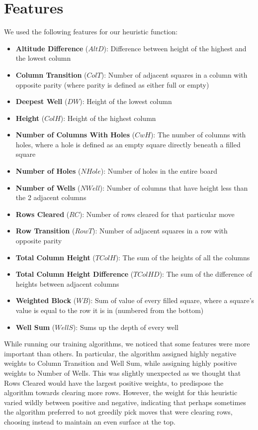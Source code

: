 \documentclass[12pt]{article}
\begin{document}
    \section{Features}
    We used the following features for our heuristic function:
    \begin{itemize}
		\setlength\itemsep{-1mm}
        \item \textbf{Altitude Difference} ($AltD$): Difference between height of the highest
        and the lowest column
		\item \textbf{Column Transition} ($ColT$): Number of adjacent squares in a column with opposite parity (where parity is defined as either full or empty)
		\item \textbf{Deepest Well} ($DW$): Height of the lowest column
        \item \textbf{Height} ($ColH$): Height of the highest column
		\item \textbf{Number of Columns With Holes} ($CwH$): The number of columns with holes, where a hole
		is defined as an empty square directly beneath a filled square
        \item \textbf{Number of Holes} ($NHole$): Number of holes in the entire board
        \item \textbf{Number of Wells} ($NWell$): Number of columns that have height less than the 2
        adjacent columns
		\item \textbf{Rows Cleared} ($RC$): Number of rows cleared for that particular move
		\item \textbf{Row Transition} ($RowT$): Number of adjacent squares in a row with opposite parity
        \item \textbf{Total Column Height} ($TColH$): The sum of the heights of all the columns
        \item \textbf{Total Column Height Difference} ($TColHD$): The sum of the difference of heights between adjacent columns
        \item \textbf{Weighted Block} ($WB$): Sum of value of every filled square, where a square's value is equal to
		the row it is in (numbered from the bottom)
        \item \textbf{Well Sum} ($WellS$): Sums up the depth of every well
    \end{itemize}

    While running our training algorithms, we noticed that some features were more
	important than others. In particular, the algorithm assigned highly negative
	weights to Column Transition and Well Sum, while assigning highly positive
	weights to Number of Wells. This was slightly unexpected as we thought that
	Rows Cleared would have the largest positive weights, to predispose the algorithm
	towards clearing more rows. However, the weight for this heuristic varied wildly
	between positive and negative, indicating that perhaps sometimes the algorithm
	preferred to not greedily pick moves that were clearing rows, choosing instead
	to maintain an even surface at the top.
\end{document}

